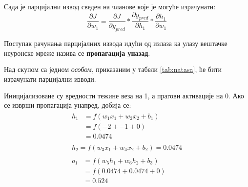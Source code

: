 \documentclass[12pt, а4paper]{article}
\begin{document}
Сада је парцијални извод сведен на чланове које је могуће израчунати:
\begin{equation}
\frac{\partial J}{\partial w_1} = \frac{\partial J}{\partial y_{pred}} * \frac{\partial y_{pred}}{\partial h_1} * \frac{\partial h_1}{\partial w_1}
\end{equation}

Поступак рачунања парцијалних извода идући од излаза ка улазу
вештачке неуронске мреже
назива се \textbf{пропагација уназад}.

Над скупом са једном \textit{особом}, приказаним у табели \ref{tab:natasa},
ће бити израчунати парцијални изводи.

Иницијализоване су вредности тежине веза на 1, а прагови активације на 0. Ако
се изврши пропагација унапред, добија се:
\begin{equation}
\begin{gathered}
\begin{split}
h_1 & = f(w_1 x_1 + w_2 x_2 + b_1) \\
& = f(-2 + -1 + 0) \\
& = 0.0474
\end{split}\\

\begin{split}
h_2 = f(w_3 x_1 + w_4 x_2 + b_2) = 0.0474
\end{split}\\

\begin{split}
o_1 & = f(w_5 h_1 + w_6 h_2 + b_3) \\
& = f(0.0474 + 0.0474 + 0) \\
& = 0.524
\end{split}
\end{gathered}
\end{equation}
\end{document}
